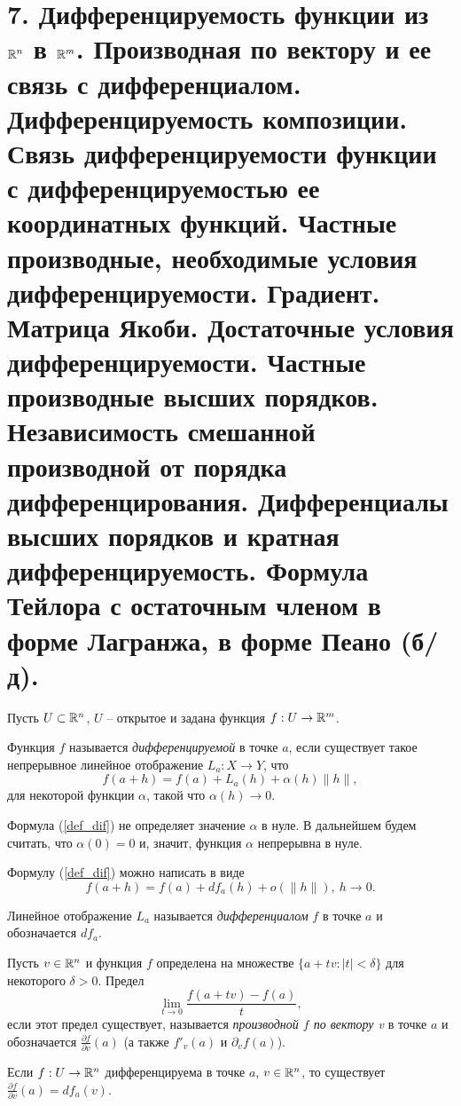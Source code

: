 \section{7. Дифференцируемость функции из $\mathbb{R}^n$ в $\mathbb{R}^m$. Производная по вектору и ее связь с дифференциалом. Дифференцируемость композиции. Связь дифференцируемости функции с дифференцируемостью ее координатных функций. Частные производные, необходимые условия дифференцируемости. Градиент. Матрица Якоби. Достаточные условия дифференцируемости. Частные производные высших порядков. Независимость смешанной производной от порядка дифференцирования. Дифференциалы высших порядков и кратная дифференцируемость. Формула Тейлора с остаточным членом в форме Лагранжа, в форме Пеано (б/д).}

Пусть $U \subset \mathbb{R}^{n}$, $U$ -- открытое и задана функция $f: U \to \mathbb{R}^{m}$.

\begin{definition}
    Функция $f$ называется \textit{дифференцируемой} в точке $a$, если существует такое непрерывное линейное отображение $L_{a}: X \to Y$, что 
    \[f(a + h) = f(a) + L_{a}(h) + \alpha(h)\|h\|, \label{def_dif}\]
    для некоторой функции $\alpha$, такой что $\alpha(h) \to 0$.
\end{definition}

\begin{note}
    Формула (\ref{def_dif}) не определяет значение $\alpha$ в нуле. В дальнейшем будем считать, что $\alpha(0) = 0$ и, значит, функция $\alpha$ непрерывна в нуле.

    Формулу (\ref{def_dif}) можно написать в виде
    \[f(a + h) = f(a) + df_{a}(h) + o(\|h\|), \ h \to 0.\]

    Линейное отображение $L_{a}$ называется \textit{дифференциалом} $f$ в точке $a$ и обозначается $df_{a}$.
\end{note}

\begin{definition}
    Пусть $v \in \mathbb{R}^{n}$ и функция $f$ определена на множестве $\{a + tv: |t| < \delta\}$ для некоторого $\delta > 0$. Предел 
    \[\lim_{t \to 0} \frac{f(a + tv) - f(a)}{t},\]
    если этот предел существует, называется \textit{производной $f$ по вектору v} в точке $a$ и обозначается $\frac{\partial f}{\partial v}(a)$ (а также $f'_{v}(a)$ и $\partial_{v}f(a)$).
\end{definition}

\begin{theorem}
    \label{th_dif1}
    Если $f: U \to \mathbb{R}^{n}$ дифференцируема в точке $a$, $v \in \mathbb{R}^{n}$, то существует $\frac{\partial f}{\partial v}(a) = df_{a}(v)$.
\end{theorem}

